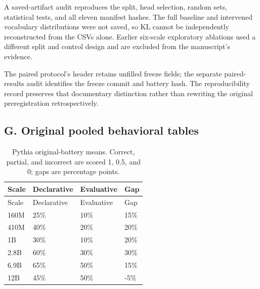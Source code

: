 \documentclass[
  english,
]{article}
\begin{document}
A saved-artifact audit reproduces the split, head selection, random sets, statistical tests, and all eleven manifest hashes. The full baseline and intervened vocabulary distributions were not saved, so KL cannot be independently reconstructed from the CSVs alone. Earlier six-scale exploratory ablations used a different split and control design and are excluded from the manuscript's evidence.

The paired protocol's header retains unfilled freeze fields; the separate paired-results audit identifies the freeze commit and battery hash. The reproducibility record preserves that documentary distinction rather than rewriting the original preregistration retrospectively.

\subsection{G. Original pooled behavioral tables}\label{g.-original-pooled-behavioral-tables}

\begingroup\small
\begin{longtable}[]{@{}llll@{}}
\caption{Pythia original-battery means. Correct, partial, and incorrect are scored 1, 0.5, and 0; gaps are percentage points. \label{tab:pooled-pythia}}\tabularnewline
\toprule\noalign{}
Scale & Declarative & Evaluative & Gap \\
\midrule\noalign{}
\endfirsthead
\toprule\noalign{}
Scale & Declarative & Evaluative & Gap \\
\midrule\noalign{}
\endhead
\bottomrule\noalign{}
\endlastfoot
160M & 25\% & 10\% & 15\% \\
410M & 40\% & 20\% & 20\% \\
1B & 30\% & 10\% & 20\% \\
2.8B & 60\% & 30\% & 30\% \\
6.9B & 65\% & 50\% & 15\% \\
12B & 45\% & 50\% & -5\% \\
\end{longtable}
\endgroup
\end{document}
